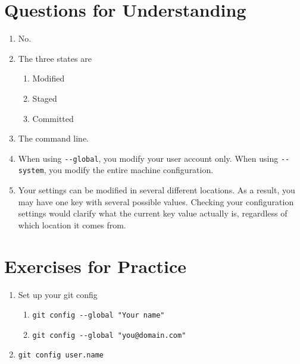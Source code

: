 \section{Questions for Understanding}
\begin{enumerate}
    \item No.
    \item The three states are
        \begin{enumerate}
            \item Modified
            \item Staged
            \item Committed
        \end{enumerate}
    \item The command line.
    \item When using \verb+--global+, you modify your user account only.
        When using \verb+--system+, you modify the entire machine
        configuration.
    \item Your settings can be modified in several different locations.
        As a result, you may have one key with several possible values.
        Checking your configuration settings would clarify what the current
        key value actually is, regardless of which location it comes from.
\end{enumerate}

\section{Exercises for Practice}
\begin{enumerate}
    \item Set up your git config
        \begin{enumerate}
            \item \verb+git config --global "Your name"+
            \item \verb+git config --global "you@domain.com"+
        \end{enumerate}
    \item \verb+git config user.name+
\end{enumerate}
